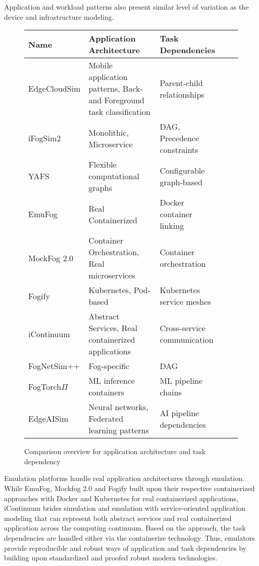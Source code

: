 Application and workload patterns also present similar level of variation as the device and infrastructure modeling.

\begin{figure}[H]
  \centering
  \begin{tabularx}{\textwidth}{ l | X | X | X | X }
    \hline
    \textbf{Name} & \textbf{Application Architecture} & \textbf{Task Dependencies}\\
    \hline\hline
    EdgeCloudSim  & Mobile application patterns, Back- and Foreground task classification & Parent-child relationships \\\hline
    iFogSim2      & Monolithic, Microservice                                              & DAG, Precedence constraints \\\hline
    YAFS          & Flexible computational graphs                                         & Configurable graph-based \\\hline
    EmuFog        & Real Containerized                                                    & Docker container linking \\\hline
    MockFog 2.0   & Container Orchestration, Real microservices                           & Container orchestration \\\hline
    Fogify        & Kubernetes, Pod-based                                                 & Kubernetes service meshes\\\hline
    iContinuum    & Abstract Services, Real containerized applications                    & Cross-service communication \\\hline
    FogNetSim++   & Fog-specific                                                          & DAG \\\hline
    FogTorch$\Pi$ & ML inference containers                                               & ML pipeline chains \\\hline
    EdgeAISim     & Neural networks, Federated learning patterns                          & AI pipeline dependencies \\\hline
    
  \end{tabularx}
  \caption{Comparison overview for application architecture and task dependency}
  \label{tab:analysis-application-arch-task-dep}
\end{figure}
Emulation platforms handle real application architectures through emulation.
While EmuFog, Mockfog 2.0 and Fogify built upon their respective containerized approaches with Docker and Kubernetes for real containerized applications, iContinuum brides simulation and emulation with service-oriented application modeling that can represent both abstract services and real containerized application across the computing continuum.
Based on the approach, the task dependencies are handled either via the containerize technology.
Thus, emulators provide reproducible and robust ways of application and task dependencies by building upon standardized and proofed robust modern technologies.

